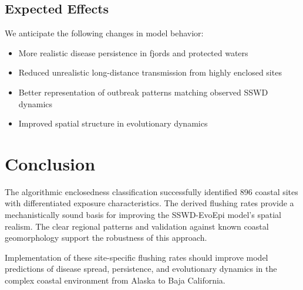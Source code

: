 \documentclass[11pt]{article}
\begin{document}
\subsection{Expected Effects}
We anticipate the following changes in model behavior:
\begin{itemize}
    \item More realistic disease persistence in fjords and protected waters
    \item Reduced unrealistic long-distance transmission from highly enclosed sites
    \item Better representation of outbreak patterns matching observed SSWD dynamics
    \item Improved spatial structure in evolutionary dynamics
\end{itemize}

\section{Conclusion}

The algorithmic enclosedness classification successfully identified 896 coastal sites with differentiated exposure characteristics. The derived flushing rates provide a mechanistically sound basis for improving the SSWD-EvoEpi model's spatial realism. The clear regional patterns and validation against known coastal geomorphology support the robustness of this approach.

Implementation of these site-specific flushing rates should improve model predictions of disease spread, persistence, and evolutionary dynamics in the complex coastal environment from Alaska to Baja California.
\end{document}
